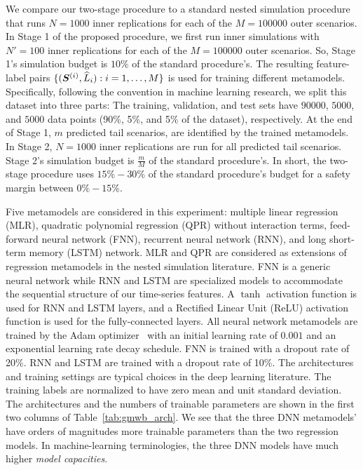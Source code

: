 We compare our two-stage procedure to a standard nested simulation procedure that runs $N=\num{1000}$ inner replications for each of the $M=\num{100000}$ outer scenarios.
In Stage 1 of the proposed procedure, we first run inner simulations with $N'=100$ inner replications for each of the $M=\num{100000}$ outer scenarios.
So, Stage 1's simulation budget is $10\%$ of the standard procedure's.
The resulting feature-label pairs $\{(\bm{S}^{(i)}, \widehat{L}_i): i=1,\ldots,M\}$ is used for training different  metamodels.
Specifically, following the convention in machine learning research, we split this dataset into three parts: The training, validation, and test sets have $\num{90000}$, $\num{5000}$, and $\num{5000}$ data points (90\%, 5\%, and 5\% of the dataset), respectively.
At the end of Stage 1, $m$ predicted tail scenarios, are identified by the trained metamodels.
In Stage 2, $N=\num{1000}$ inner replications are run for all predicted tail scenarios.
Stage 2's simulation budget is $\frac{m}{M}$ of the standard procedure's.
In short, the two-stage procedure uses $15\% - 30\%$ of the standard procedure's budget for a safety margin between $0\% - 15\%$.

Five metamodels are considered in this experiment: multiple linear regression (MLR), quadratic polynomial regression (QPR) without interaction terms, feed-forward neural network (FNN), recurrent neural network (RNN), and long short-term memory (LSTM) network.
MLR and QPR are considered as extensions of regression metamodels in the nested simulation literature.
FNN is a generic neural network while RNN and LSTM are specialized models to accommodate the sequential structure of our time-series features.
A $\tanh$ activation function is used for RNN and LSTM layers, and a Rectified Linear Unit (ReLU) activation function is used for the fully-connected layers.
All neural network metamodels are trained by the Adam optimizer~\citep{kingma2014adam} with an initial learning rate of $0.001$ and an exponential learning rate decay schedule.
FNN is trained with a dropout rate of 20\%.
RNN and LSTM are trained with a dropout rate of 10\%.
The architectures and training settings are typical choices in the deep learning literature.
The training labels are normalized to have zero mean and unit standard deviation.
The architectures and the numbers of trainable parameters are shown in the first two columns of Table~\ref{tab:gmwb_arch}.
We see that the three DNN metamodels' have orders of magnitudes more trainable parameters than the two regression models.
In machine-learning terminologies, the three DNN models have much higher \textit{model capacities}.

